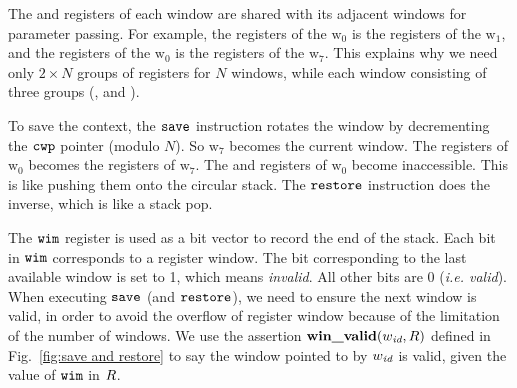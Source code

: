 The \inRN{} and \outRN{} registers of each window are shared
with its adjacent windows for parameter passing.
For example, the \inRN{} registers of the $\text{w}_0$
is the \outRN{} registers of the $\text{w}_1$,
and the \outRN{} registers of the $\text{w}_0$
is the \inRN{} registers of the $\text{w}_7$.
This explains
why we need only $2\times N$ groups of registers for
$N$ windows, while each window consisting of
three groups (\outRN{}, \localRN{} and \inRN{}).

To save the context, the $\texttt{save}$ instruction
rotates the window by decrementing the $\texttt{cwp}$ pointer
(modulo $N$).
So $\text{w}_7$ becomes the current window. The \outRN{}
registers of $\text{w}_0$ becomes
the \inRN{} registers of $\text{w}_7$.
The \inRN{} and \localRN{} registers of $\text{w}_0$
become inaccessible.
This is like pushing them
onto the circular stack.
The $\texttt{restore}$ instruction does the inverse, which is like
a stack pop.

The $\texttt{wim}$ register is used as a bit vector to record the
end of the stack. Each bit in $\texttt{wim}$ corresponds to a
register window. The bit corresponding to the last available
window is set to 1, which means {\em invalid}. All other bits
are 0 ({\em i.e. valid}).
When executing $\texttt{save}$ (and $\texttt{restore}$), we need to ensure
the next window is valid, in order to avoid the overflow
of register window because of the limitation of the number
of windows. We use the assertion $\textbf{win\_valid}{(}w_{\textit{id}}, R)$ defined
in Fig.~\ref{fig:save and restore} to say the
window pointed to by $w_{\textit{id}}$ is valid, given the value of
$\texttt{wim}$ in $R$.

